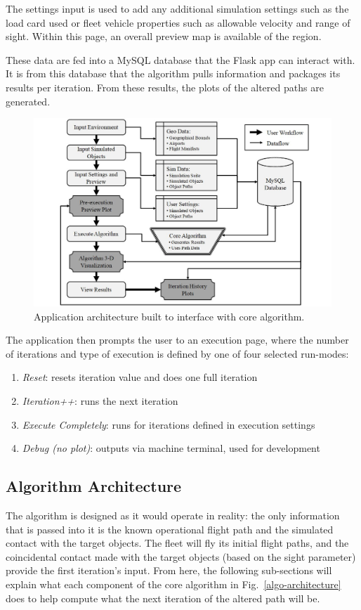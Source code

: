 \documentclass[conf]{new-aiaa}
\begin{document}
The settings input is used to add any additional simulation settings such as the load card used or fleet vehicle properties such as allowable velocity and range of sight. Within this page, an overall preview map is available of the region.

These data are fed into a MySQL database that the Flask app can interact with. It is from this database that the algorithm pulls information and packages its results per iteration. From these results, the plots of the altered paths are generated.

\begin{figure}[hbt!]
\centering
\includegraphics[width=1\textwidth]{figs/app-architecture}
\caption{Application architecture built to interface with core algorithm.}
\label{app-architecture}
\end{figure}

The application then prompts the user to an execution page, where the number of iterations and type of execution is defined by one of four selected run-modes:
\begin{enumerate}
\item \emph{Reset}: resets iteration value and does one full iteration
\item \emph{Iteration++}: runs the next iteration
\item \emph{Execute Completely}: runs for iterations defined in execution settings
\item \emph{Debug (no plot)}: outputs via machine terminal, used for development
\end{enumerate}

\subsection{Algorithm Architecture}
The algorithm is designed as it would operate in reality: the only information that is passed into it is the known operational flight path and the simulated contact with the target objects. The fleet will fly its initial flight paths, and the coincidental contact made with the target objects (based on the sight parameter) provide the first iteration's input. From here, the following sub-sections will explain what each component of the core algorithm in Fig.~\ref{algo-architecture} does to help compute what the next iteration of the altered path will be.
\end{document}
